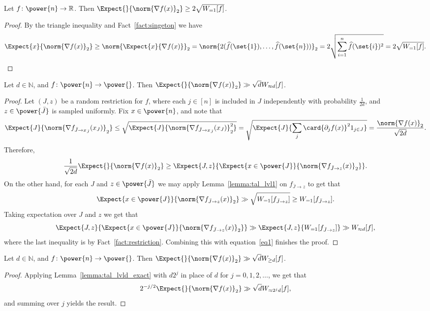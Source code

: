 \begin{lemma}\label{lemma:tal_lvl1}
  Let $f\colon\power{n}\to\mathbb{R}$. Then
  $\Expect{}{\norm{\nabla f(x)}_2 }\geq 2\sqrt{W_{=1}[f]}$.
\end{lemma}
\begin{proof}
By the triangle inequality and Fact~\ref{fact:singeton} we have
  \[
  \Expect{x}{\norm{\nabla f(x)}_2 }
  \geq \norm{\Expect{x}{\nabla f(x)}}_2
  = \norm{2(\widehat{f}(\set{1}),\ldots,\widehat{f}(\set{n}))}_2
  = 2\sqrt{\sum\limits_{i=1}^{n}\widehat{f}(\set{i})^2}
  = 2\sqrt{W_{=1}[f]}.
  \qedhere
 \]
\end{proof}

\begin{lemma}\label{lemma:tal_lvld_exact}
  Let $d\in\mathbb{N}$, and $f\colon\power{n}\to\power{}$. Then
  $\Expect{}{\norm{\nabla f(x)}_2 }\gg \sqrt{d}W_{\approx d}[f]$.
\end{lemma}
\begin{proof}
  Let $(J,z)$ be a random restriction for $f$, where each $j\in[n]$ is included in $J$ independently with probability
  $\frac{1}{2d}$, and $z\in\power{\bar{J}}$ is sampled uniformly. Fix $x\in \power{n}$, and note that
  \[
    \Expect{J}{\norm{\nabla f_{\bar{J}\rightarrow x_{\bar{J}}}(x_J)}_2}
    \leq \sqrt{\Expect{J}{\norm{\nabla f_{\bar{J}\rightarrow x_{\bar{J}}}(x_J)}^2_2}}
    =\sqrt{\Expect{J}{\sum\limits_{j}{\card{\partial_j f(x)}^2 1_{j\in J}}}}
    =\frac{\norm{\nabla f(x)}_2}{\sqrt{2d}}.
  \]
  Therefore,
  \begin{equation}\label{eq1}
  \frac{1}{\sqrt{2d}}\Expect{}{\norm{\nabla f(x)}_2}\geq \Expect{J,z}{\Expect{x\in\power{J}}{\norm{\nabla f_{\bar{J}\rightarrow z}(x)}_2}}.
  \end{equation}
  On the other hand, for each $J$ and $z\in\power{\bar{J}}$ we may apply Lemma~\ref{lemma:tal_lvl1} on $f_{\bar{J}\rightarrow z}$ to get that
  \[
  \Expect{x\in\power{J}}{\norm{\nabla f_{\bar{J}\rightarrow z}(x)}_2}\gg \sqrt{W_{=1}[f_{\bar{J}\rightarrow z}]}\geq W_{=1}[f_{\bar{J}\rightarrow z}].
  \]
  Taking expectation over $J$ and $z$ we get that
  \[
  \Expect{J,z}{\Expect{x\in\power{J}}{\norm{\nabla f_{\bar{J}\rightarrow z}(x)}_2}}
  \gg \Expect{J,z}{W_{=1}[f_{\bar{J}\rightarrow z}]}
  \gg W_{\approx d}[f],
  \]
  where the last inequality is by Fact~\ref{fact:restriction}. Combining this with equation~\eqref{eq1} finishes the proof.
\end{proof}


\begin{lemma}\label{lemma:tal_lvld_above}
  Let $d\in\mathbb{N}$, and $f\colon\power{n}\to\power{}$. Then
  $\Expect{}{\norm{\nabla f(x)}_2 }\gg \sqrt{d}W_{\geq d}[f]$.
\end{lemma}
\begin{proof}
  Applying Lemma~\ref{lemma:tal_lvld_exact} with $d 2^{j}$ in place of $d$ for $j=0,1,2,\ldots$, we get that
  \[
    2^{-j/2}\Expect{}{\norm{\nabla f(x)}_2 }
    \gg \sqrt{d}W_{\approx 2^{j} d}[f],
  \]
  and summing over $j$ yields the result.
\end{proof}

